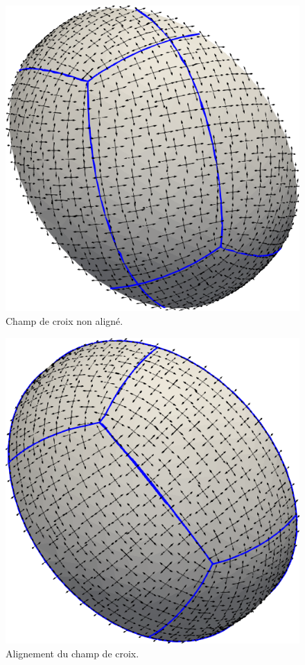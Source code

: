 \begin{figure}[!h]
\centering
\includegraphics[scale=0.38]{images/nonalign.png}
\caption{Champ de croix non aligné.}
\label{nonalign}
\end{figure}

\begin{figure}[!h]
\centering
\includegraphics[scale=0.38]{images/align.png}
\caption{Alignement du champ de croix.}
\label{align}
\end{figure}

